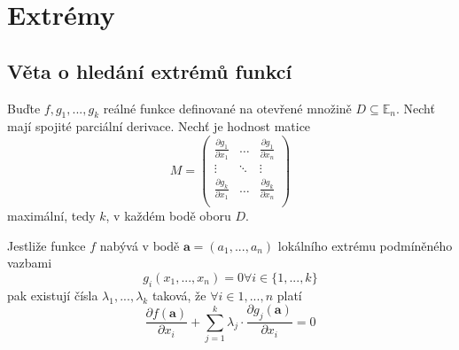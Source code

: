 \documentclass[../main.tex]{subfiles}
\begin{document}
\section{Extrémy}
\hspace{1.2mm}
\noindent

\subsection{Věta o hledání extrémů funkcí}
\hspace{1.2mm}
\noindent
Buďte $f,g_1, ... , g_k$ reálné funkce definované na otevřené množině $D \subseteq \mathbb{E}_n$.
Nechť mají spojité parciální derivace. Nechť je hodnost matice
\[ M = \begin{pmatrix}
\frac{\partial g_1}{\partial x_1} & \dots & \frac{\partial g_1}{\partial x_n}\\
\vdots & \ddots & \vdots\\
\frac{\partial g_k}{\partial x_1} & \dots & \frac{\partial g_k}{\partial x_n}\\
\end{pmatrix}\]
maximální, tedy $k$, v každém bodě oboru $D$.

\noindent
\hspace{1.2mm}
Jestliže funkce $f$ nabývá v bodě $\mathbf{a} = (a_1, ... , a_n)$ lokálního extrému podmíněného vazbami
\[ g_i(x_1, ... , x_n) = 0 \forall i \in \{ 1, ... , k \} \]
pak existují čísla $\lambda _1, ... , \lambda _k$ taková, že $\forall i \in {1, ... , n}$ platí
\[ \frac{\partial f(\mathbf{a})}{\partial x_i} +
\sum_{j=1}^{k}\lambda_j \cdot \frac{\partial g_j(\mathbf{a})}{\partial x_i} = 0 \]
\end{document}
